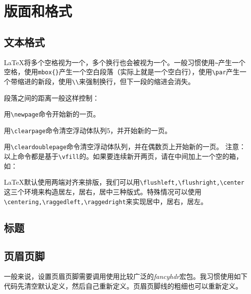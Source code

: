 {\let\clearpage\relax \chapter{版面和格式}}

\section{文本格式}

\LaTeX 将多个空格视为一个，多个换行也会被视为一个。一般习惯使用\lstinline|~|产生一个空格，使用\lstinline|mbox{}|产生一个空白段落（实际上就是一个空白行），使用\lstinline|\par|产生一个带缩进的新段，使用\lstinline|\\|来强制换行，但下一段的缩进会消失。

段落之间的距离一般这样控制：

\begin{latex}
\setlength{\parskip}{0pt plus 1pt}%
\end{latex}

用\lstinline|\newpage|命令开始新的一页。

用\lstinline|\clearpage|命令清空浮动体队列5，并开始新的一页。

用\lstinline|\cleardoublepage|命令清空浮动体队列，并在偶数页上开始新的一页。
注意：以上命令都是基于\lstinline|\vfill|的。如果要连续新开两页，请在中间加上一个空的箱，如：

\begin{latex}
\newpage\mbox{}\newpage
\end{latex}

\LaTeX 默认使用两端对齐来排版，我们可以用\lstinline|\flushleft,\flushright,\center|这三个环境来构造居左，居右，居中三种版式。特殊情况可以使用\lstinline|\centering,\raggedleft,\raggedright|来实现居中，居右，居左。

\section{标题}

\section{页眉页脚}
一般来说，设置页眉页脚需要调用使用比较广泛的\emph{fancyhdr}宏包。我习惯使用如下代码先清空默认定义，然后自己重新定义。页眉页脚线的粗细也可以重新定义。

\begin{latex}
\usepackage{fancyhdr}
\pagestyle{fancy}
\fancyhf{}%
    \lhead{}%
    \cfoot{}
    \fancyhead[RO,LE]{}%
    \fancyfoot[LE,RO]{\thepage}
\renewcommand{\headrulewidth}{0.4 pt}
\renewcommand{\footrulewidth}{0.4 pt}
\end{latex}


